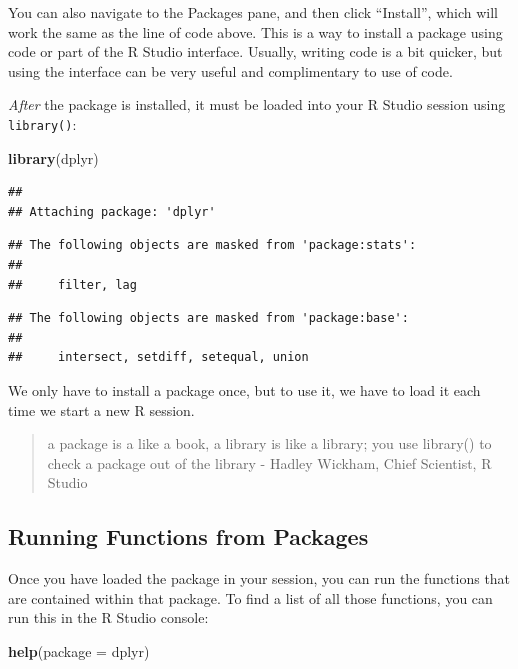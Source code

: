 \documentclass[]{book}
\newenvironment{Shaded}{\begin{snugshade}}{\end{snugshade}}
\newcommand{\KeywordTok}[1]{\textcolor[rgb]{0.13,0.29,0.53}{\textbf{#1}}}
\newcommand{\DataTypeTok}[1]{\textcolor[rgb]{0.13,0.29,0.53}{#1}}
\newcommand{\NormalTok}[1]{#1}
\begin{document}
You can also navigate to the Packages pane, and then click ``Install'',
which will work the same as the line of code above. This is a way to
install a package using code or part of the R Studio interface. Usually,
writing code is a bit quicker, but using the interface can be very
useful and complimentary to use of code.

\emph{After} the package is installed, it must be loaded into your R
Studio session using \texttt{library()}:

\begin{Shaded}
\begin{Highlighting}[]
\KeywordTok{library}\NormalTok{(dplyr)}
\end{Highlighting}
\end{Shaded}

\begin{verbatim}
## 
## Attaching package: 'dplyr'
\end{verbatim}

\begin{verbatim}
## The following objects are masked from 'package:stats':
## 
##     filter, lag
\end{verbatim}

\begin{verbatim}
## The following objects are masked from 'package:base':
## 
##     intersect, setdiff, setequal, union
\end{verbatim}

We only have to install a package once, but to use it, we have to load
it each time we start a new R session.

\begin{quote}
a package is a like a book, a library is like a library; you use
library() to check a package out of the library - Hadley Wickham, Chief
Scientist, R Studio
\end{quote}

\subsection{Running Functions from
Packages}\label{running-functions-from-packages}

Once you have loaded the package in your session, you can run the
functions that are contained within that package. To find a list of all
those functions, you can run this in the R Studio console:

\begin{Shaded}
\begin{Highlighting}[]
\KeywordTok{help}\NormalTok{(}\DataTypeTok{package =}\NormalTok{ dplyr)}
\end{Highlighting}
\end{Shaded}
\end{document}
